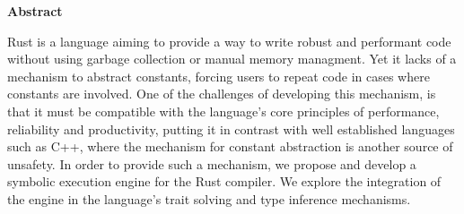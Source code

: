 
\clearemptydoublepage
{}
{}

\vspace*{2cm}
\begin{center}
{\Large \textbf{Abstract}}
\end{center}
\vspace{1cm}

Rust is a language aiming to provide a way to write robust and performant code
without using garbage collection or manual memory managment. Yet it lacks of a
mechanism to abstract constants, forcing users to repeat code in cases where
constants are involved. One of the challenges of developing this mechanism, is
that it must be compatible with the language's core principles of performance,
reliability and productivity, putting it in contrast with well established
languages such as C++, where the mechanism for constant abstraction is another
source of unsafety. In order to provide such a mechanism, we propose and
develop a symbolic execution engine for the Rust compiler. We explore the
integration of the engine in the language's trait solving and type inference
mechanisms.

